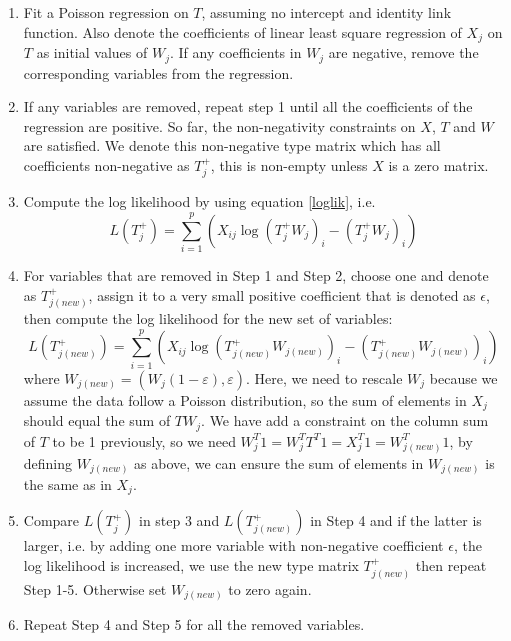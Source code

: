 \documentclass[a4paper,12pt]{article}
\begin{document}
\begin{enumerate}
\item Fit a Poisson regression on $T$, assuming no intercept and identity link function. Also denote the coefficients of linear least square regression of $X_j$ on $T$ as initial values of $W_{j}$.  If any coefficients in $W_{j}$ are negative, remove the corresponding variables from the regression.
\item If any variables are removed, repeat step 1 until all the coefficients of the regression are positive. So far, the non-negativity constraints on $X$, $T$ and $W$ are satisfied. We denote this non-negative type matrix which has all coefficients non-negative as $T_{j}^{+}$, this is non-empty unless $X$ is a zero matrix.
\item Compute the log likelihood by using equation \ref{loglik}, i.e.
\begin{equation*}
L\left(T_{j}^{+}\right)=\sum_{i=1}^{p}\left(X_{i j} \log \left(T_{j}^{+} W_{j}\right)_{i}-\left(T_{j}^{+} W_{j}\right)_{i}\right)
\end{equation*}
\item For variables that are removed in Step 1 and Step 2, choose one and denote as $T_{j(new)}^{+}$, assign it to a very small positive coefficient that is denoted as $\epsilon$, then compute the log likelihood for the new set of variables:
\begin{equation*}
L\left(T_{j(new)}^{+}\right) =\sum_{i=1}^{p}\left(X_{i j} \log \left(T_{j(new)}^{+} W_{j(new)}\right)_{i}-\left(T_{j(new)}^{+} W_{j(new)}\right)_{i}\right)
\end{equation*}
where $W_{j(new)}=\left(W_{j}(1-\varepsilon), \varepsilon\right)$. Here, we need to rescale $W_{j}$ because we assume the data follow a Poisson distribution, so the sum of elements in $X_{j}$ should equal the sum of $TW_{j}$. We have add a constraint on the column sum of $T$ to be 1 previously, so we need $W_{j}^{T} 1=W_{j}^{T} T^{T} 1=X_{j}^{T} 1 = W_{j(new)}^{T} 1$, by defining $W_{j(new)}$ as above, we can ensure the sum of elements in $W_{j(new)}$ is the same as in $X_{j}$.
\item Compare $L\left(T_{j}^{+}\right)$ in step 3 and $L\left(T_{j(new)}^{+}\right)$ in Step 4 and if the latter is larger, i.e. by adding one more variable with non-negative coefficient $\epsilon$, the log likelihood is increased, we use the new type matrix $T_{j(new)}^{+}$ then repeat Step 1-5. Otherwise set $W_{j(new)}$ to zero again.
\item Repeat Step 4 and Step 5 for all the removed variables.
\end{enumerate}
\end{document}

